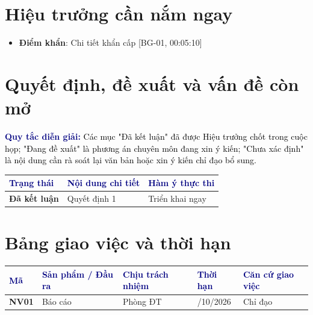 \documentclass[11pt,a4paper]{article}
\newcommand{\source}[1]{\textcolor{muted}{\footnotesize\textsf{[#1]}}}
\newcommand{\notice}[2]{%
  \vspace{4pt}%
  \noindent\colorbox{light}{%
    \parbox{\dimexpr\textwidth-2\fboxsep\relax}{%
      \vspace{2pt}%
      \small\textbf{\textcolor{navy}{#1:}} \textcolor{black}{#2}%
      \vspace{2pt}%
    }%
  }%
  \vspace{4pt}%
}
\begin{document}
\section{Hiệu trưởng cần nắm ngay}

\begin{itemize}[leftmargin=1.5em, itemsep=3pt]
  \item \textbf{Điểm khẩn}: Chi tiết khẩn cấp \source{BG-01, 00:05:10}
\end{itemize}

\section{Quyết định, đề xuất và vấn đề còn mở}

\notice{Quy tắc diễn giải}{Các mục "Đã kết luận" đã được Hiệu trưởng chốt trong cuộc họp; "Đang đề xuất" là phương án chuyên môn đang xin ý kiến; "Chưa xác định" là nội dung cần rà soát lại văn bản hoặc xin ý kiến chỉ đạo bổ sung.}

\vspace{3pt}
\begin{tabularx}{\textwidth}{@{}>{\raggedright\arraybackslash\bfseries}p{2.8cm} >{\raggedright\arraybackslash}X >{\raggedright\arraybackslash}p{4.5cm}@{}}
  \toprule
  \rowcolor{light}
  \textcolor{navy}{Trạng thái} & \textcolor{navy}{Nội dung chi tiết} & \textcolor{navy}{Hàm ý thực thi} \\
  \midrule
  \textbf{Đã kết luận} & Quyết định 1 & Triển khai ngay \\
  \midrule
  \bottomrule
\end{tabularx}

\section{Bảng giao việc và thời hạn}

\begin{tabularx}{\textwidth}{@{}>{\bfseries\centering\arraybackslash}p{1.3cm} >{\raggedright\arraybackslash}X >{\raggedright\arraybackslash}p{3.2cm} >{\centering\arraybackslash}p{2.2cm} >{\raggedright\arraybackslash}p{3.2cm}@{}}
  \toprule
  \rowcolor{light}
  \textcolor{navy}{Mã} & \textcolor{navy}{Sản phẩm / Đầu ra} & \textcolor{navy}{Chịu trách nhiệm} & \textcolor{navy}{Thời hạn} & \textcolor{navy}{Căn cứ giao việc} \\
  \midrule
  NV01 & Báo cáo & Phòng ĐT & 10/10/2026 & \small Chỉ đạo \\
  \midrule
  \bottomrule
\end{tabularx}
\end{document}
